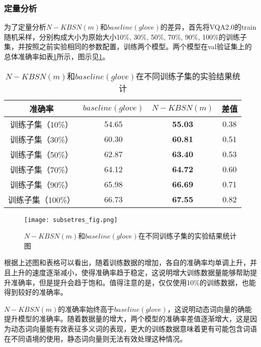 \subsubsection{定量分析}
为了定量分析$N-KBSN(m)$和$baseline(glove)$的差异，首先将VQA2.0的train随机采样，分别构成大小为原始大小10\%, 30\%, 50\%, 70\%, 90\%, 100\%的训练子集，并按照之前实验相同的参数配置，训练两个模型。两个模型在val验证集上的总体准确率如表\ref{subsetres}所示，图示见\ref{subsetres_fig}。
\begin{table}[H]
\centering
\caption{$N-KBSN(m)$和$baseline(glove)$在不同训练子集的实验结果统计}
\begin{tabular}{cccc}
\toprule
准确率 & $baseline(glove)$ & $N-KBSN(m)$ & 差值\\
\midrule
训练子集（10\%）&  54.65 & \textbf{55.03} & 0.38\\
训练子集（30\%）&  60.30& \textbf{60.81} & 0.51\\
训练子集（50\%）&  62.87& \textbf{63.40} & 0.53\\
训练子集（70\%）&  64.12& \textbf{64.72} & 0.60\\
训练子集（90\%）&  65.98& \textbf{66.69} & 0.71\\
训练子集（100\%）& 66.73 & \textbf{67.55} & 0.82\\
\bottomrule
\end{tabular}
\label{subsetres}
\end{table}
\begin{figure}[H]
	\texttt{[image: subsetres\_fig.png]}
	\caption{$N-KBSN(m)$和$baseline(glove)$在不同训练子集的实验结果统计图}
	\label{subsetres_fig}
\end{figure}

根据上述图和表格可以看出，随着训练数据的增加，各自的准确率均单调上升，并且上升的速度逐渐减小，使得准确率趋于稳定，这说明增大训练数据量能够帮助提升准确率，但是提升会趋于饱和。值得注意的是，仅仅使用10\%的训练数据，也能得到较好的准确率。

$N-KBSN(m)$的准确率始终高于$baseline(glove)$，这说明动态词向量的确能提升模型的准确率。随着数据量的增大，两个模型的准确率差值逐渐增大，这是因为动态词向量能有效表征多义词的表现，更大的训练数据意味着更有可能包含词语在不同语境的使用，静态词向量则无法有效处理这种情况。

